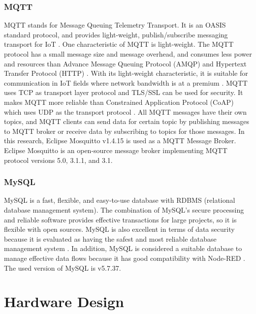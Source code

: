 \documentclass[conference]{IEEEtran}
\begin{document}
\subsubsection{MQTT}
MQTT stands for Message Queuing Telemetry Transport. It is an OASIS standard protocol, and provides light-weight, publish/subscribe messaging transport for IoT \cite{b9}.
One characteristic of MQTT is light-weight. The MQTT protocol has a small message size and message overhead, and consumes less power and resources than Advance Message Queuing Protocol (AMQP) and Hypertext Transfer Protocol (HTTP) \cite{b21}. With its light-weight characteristic, it is suitable for communication in IoT fields where network bandwidth is at a premium \cite{b27}.
MQTT uses TCP as transport layer protocol and TLS/SSL can be used for security. It makes MQTT more reliable than Constrained Application Protocol (CoAP) which uses UDP as the transport protocol \cite{b21}.
All MQTT messages have their own topics, and MQTT clients can send data for certain topic by publishing messages to MQTT broker or receive data by subscribing to topics for those messages.
In this research, Eclipse Mosquitto v1.4.15 is used as a MQTT Message Broker. Eclipse Mosquitto is an open-source message broker implementing MQTT protocol versions 5.0, 3.1.1, and 3.1\cite{b22}. 

\subsubsection{MySQL}
MySQL is a fast, flexible, and easy-to-use database with RDBMS (relational database management system). The combination of MySQL’s secure processing and reliable software provides effective transactions for large projects, so it is flexible with open sources. MySQL is also excellent in terms of data security because it is evaluated as having the safest and most reliable database management system \cite{b24}. In addition, MySQL is considered a suitable database to manage effective data flows because it has good compatibility with Node-RED \cite{b24}. The used version of MySQL is v5.7.37.

\section{Hardware Design}
\end{document}
